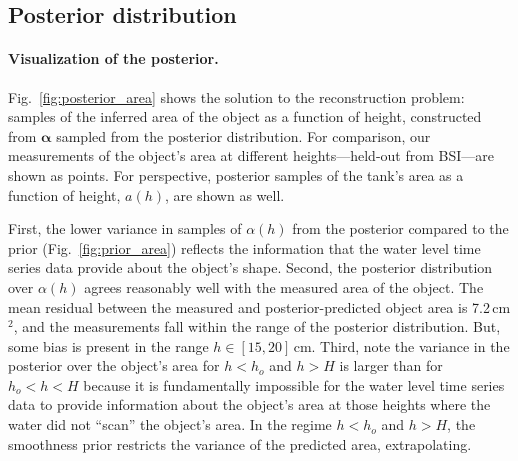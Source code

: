 \documentclass[openacc]{rsproca_new}%
\newcommand\thedata {$\{(t_i,h_{\text{obs}, i})\}_{i=1}^{N}$\xspace}
\newcommand\thedatanomath {\{(t_i,h_{\text{obs}, i})\}_{i=1}^{N}}
\begin{document}
\subsection{Posterior distribution}



\paragraph{Visualization of the posterior.} Fig.~\ref{fig:posterior_area} shows the solution to the reconstruction problem: samples of the inferred area of the object as a function of height, constructed from $\boldsymbol \alpha$ sampled from the posterior distribution. 
For comparison, our measurements of the object's area at different heights---held-out from BSI---are shown as points. 
For perspective, posterior samples of the tank's area as a function of height, $a(h)$, are shown as well. 

First, the lower variance in samples of $\alpha(h)$ from the posterior compared to the prior (Fig.~\ref{fig:prior_area}) reflects the information that the water level time series data provide about the object's shape. 
Second, the posterior distribution over $\alpha(h)$ agrees reasonably well with the measured area of the object. 
The mean residual between the measured and posterior-predicted object area is 7.2\,cm$^2$, and the measurements fall within the range of the posterior distribution. But, some bias is present in the range $h\in[15, 20]$\,cm. 
Third, note the variance in the posterior over the object's area for $h<h_o$ and $h>H$ is larger than for $h_o < h < H$ because it is fundamentally impossible for the water level time series data to provide information about the object's area at those heights where the water did not ``scan'' the object's area. In the regime $h<h_o$ and $h>H$, the smoothness prior restricts the variance of the predicted area, extrapolating. 
\end{document}
